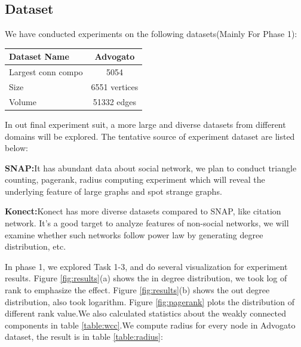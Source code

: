 \subsection{Dataset}
We have conducted experiments on the following datasets(Mainly For Phase 1):
\begin{center}
\begin{tabular}{| l | c |}
  \hline                        
  Dataset Name & Advogato  \\ \hline
  Largest conn compo & 5054  \\ \hline
  Size & 6551 vertices  \\ \hline
  Volume & 51332 edges \\ \hline
\end{tabular}
\end{center}

In out final experiment suit, a more large and diverse datasets from different domains will be explored. The tentative source of experiment dataset are listed below:
\begin{description}
	\item{{\bf SNAP:}}{It has abundant data about social network, we plan to conduct triangle counting, pagerank, radius computing experiment which will reveal the underlying feature of large graphs and spot strange graphs.}
	\item{{\bf Konect:}}{Konect has more diverse datasets compared to SNAP, like citation network. It's a good target to analyze features of non-social networks, we will examine whether such networks follow power law by generating degree distribution, etc.}
\end{description}

In phase 1, we explored Task 1-3, and do several visualization for experiment results. Figure \ref{fig:results}(a) shows the in degree distribution, we took log of rank to emphasize the effect. Figure \ref{fig:results}(b) shows the out degree distribution, also took logarithm. Figure \ref{fig:pagerank} plots the distribution of different rank value.We also calculated statistics about the weakly connected components in table \ref{table:wcc}.We compute radius for every node in Advogato dataset, the result is in table \ref{table:radius}:

